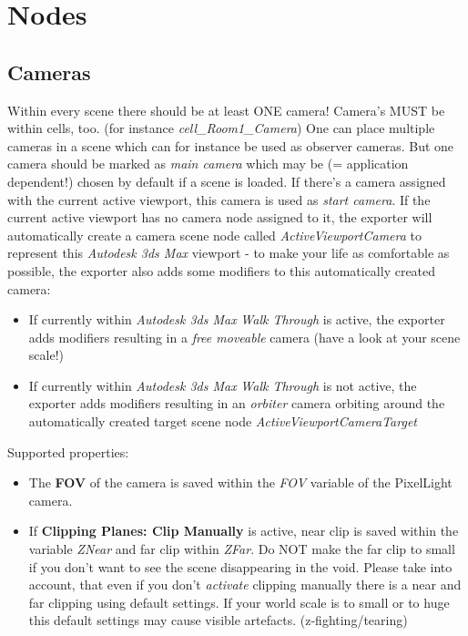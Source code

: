 \chapter{Nodes}




\section{Cameras}
Within every scene there should be at least ONE camera! Camera's MUST be within cells, too. (for instance \emph{cell\_Room1\_Camera}) One can place multiple cameras in a scene which can for instance be used as observer cameras. But one camera should be marked as \emph{main camera} which may be (= application dependent!) chosen by default if a scene is loaded. If there's a camera assigned with the current active viewport, this camera is used as \emph{start camera}. If the current active viewport has no camera node assigned to it, the exporter will automatically create a camera scene node called \emph{ActiveViewportCamera} to represent this \emph{Autodesk 3ds Max} viewport - to make your life as comfortable as possible, the exporter also adds some modifiers to this automatically created camera:
\begin{itemize}
\item{If currently within \emph{Autodesk 3ds Max} \emph{Walk Through} is active, the exporter adds modifiers resulting in a \emph{free moveable} camera (have a look at your scene scale!)}
\item{If currently within \emph{Autodesk 3ds Max} \emph{Walk Through} is not active, the exporter adds modifiers resulting in an \emph{orbiter} camera orbiting around the automatically created target scene node \emph{ActiveViewportCameraTarget}}
\end{itemize}

Supported properties:
\begin{itemize}
\item{The \textbf{FOV} of the camera is saved within the \emph{FOV} variable of the PixelLight camera.}
\item{If \textbf{Clipping Planes: Clip Manually} is active, near clip is saved within the variable \emph{ZNear} and far clip within \emph{ZFar}. Do NOT make the far clip to small if you don't want to see the scene disappearing in the void. Please take into account, that even if you don't \emph{activate} clipping manually there is a near and far clipping using default settings. If your world scale is to small or to huge this default settings may cause visible artefacts. (z-fighting/tearing)}
\end{itemize}

